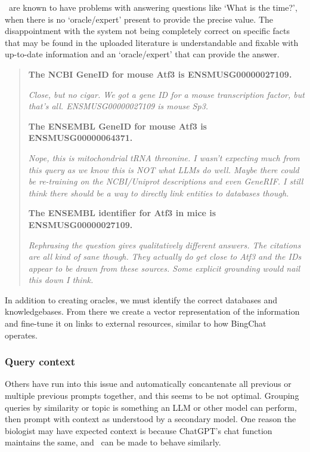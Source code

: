 \llms\ are known to have problems with answering questions like `What is the time?', when there is no `oracle/expert' present to provide the precise value.
The disappointment with the system not being completely correct on specific facts that may be found in the uploaded literature is understandable and fixable with up-to-date information and an `oracle/expert' that can provide the answer.

\begin{quotation}

\textbf{The NCBI GeneID for mouse Atf3 is ENSMUSG00000027109.}

\textit{Close, but no cigar. We got a gene ID for a mouse transcription factor, but that's all. ENSMUSG00000027109 is mouse Sp3.}


\textbf{The ENSEMBL GeneID for mouse Atf3 is ENSMUSG00000064371.}

\textit{Nope, this is mitochondrial tRNA threonine. I wasn’t expecting much from this query as we know this is NOT what LLMs do well. Maybe there could be re-training on the NCBI/Uniprot descriptions and even GeneRIF. I still think there should be a way to directly link entities to databases though.}


\textbf{The ENSEMBL identifier for Atf3 in mice is ENSMUSG00000027109.}

\textit{Rephrasing the question gives qualitatively different answers. The citations are all kind of sane though. They actually do get close to Atf3 and the IDs appear to be drawn from these sources. Some explicit grounding would nail this down I think.}
\end{quotation}

In addition to creating oracles, we must identify the correct databases and knowledgebases.
From there we create a vector representation of the information and fine-tune it on links to external resources, similar to how BingChat~\cite{BingChat:2023} operates.

\subsubsection{Query context}
Others have run into this issue and automatically concantenate all previous or multiple previous prompts together, and this seems to be not optimal.
Grouping queries by similarity or topic is something an LLM or other model can perform, then prompt with context as understood by a secondary model.
One reason the biologist may have expected context is because ChatGPT's chat function maintains the same, and \project\ can be made to behave similarly.

